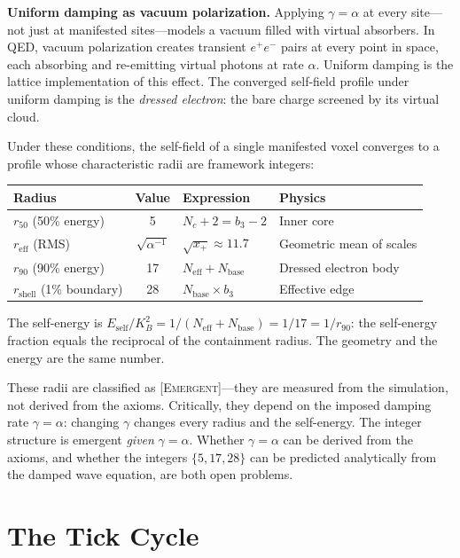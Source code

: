 \documentclass[11pt,a4paper]{article}
\newcommand{\Nc}{N_c}
\newcommand{\Neff}{N_{\mathrm{eff}}}
\newcommand{\KB}{K_B}
\newcommand{\etag}[1]{{\normalfont\textsc{\footnotesize [#1]}}}
\theoremstyle{compact}
\begin{document}
\smallskip
\noindent\textbf{Uniform damping as vacuum polarization.} Applying $\gamma = \alpha$ at every site---not just at manifested sites---models a vacuum filled with virtual absorbers. In QED, vacuum polarization creates transient $e^+e^-$ pairs at every point in space, each absorbing and re-emitting virtual photons at rate $\alpha$. Uniform damping is the lattice implementation of this effect. The converged self-field profile under uniform damping is the \emph{dressed electron}: the bare charge screened by its virtual cloud.

Under these conditions, the self-field of a single manifested voxel converges to a profile whose characteristic radii are framework integers:

\begin{center}
\small
\begin{tabular}{lcll}
\toprule
\textbf{Radius} & \textbf{Value} & \textbf{Expression} & \textbf{Physics} \\
\midrule
$r_{50}$ (50\% energy) & 5 & $\Nc + 2 = b_3 - 2$ & Inner core \\
$r_{\mathrm{eff}}$ (RMS) & $\sqrt{\alpha^{-1}}$ & $\sqrt{x_+} \approx 11.7$ & Geometric mean of scales \\
$r_{90}$ (90\% energy) & 17 & $\Neff + N_{\mathrm{base}}$ & Dressed electron body \\
$r_{\mathrm{shell}}$ (1\% boundary) & 28 & $N_{\mathrm{base}} \times b_3$ & Effective edge \\
\bottomrule
\end{tabular}
\end{center}

The self-energy is $E_{\mathrm{self}}/\KB^2 = 1/(\Neff + N_{\mathrm{base}}) = 1/17 = 1/r_{90}$: the self-energy fraction equals the reciprocal of the containment radius. The geometry and the energy are the same number.

These radii are classified as \etag{Emergent}---they are measured from the simulation, not derived from the axioms. Critically, they depend on the imposed damping rate $\gamma = \alpha$: changing $\gamma$ changes every radius and the self-energy. The integer structure is emergent \emph{given} $\gamma = \alpha$. Whether $\gamma = \alpha$ can be derived from the axioms, and whether the integers $\{5, 17, 28\}$ can be predicted analytically from the damped wave equation, are both open problems.


\section{The Tick Cycle}
\label{sec:tick}
\end{document}

